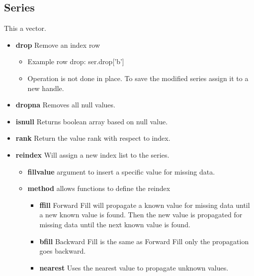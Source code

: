 \subsection{Series}
This a vector.
\begin{itemize}

  \item \textbf{drop} Remove an index row
    \begin{itemize}

      \item Example row drop: ser.drop['b']

      \item Operation is not done in place.  To save the modified series
        assign it to a new handle.
    \end{itemize}

  \item \textbf{dropna} Removes all null values.

  \item \textbf{isnull} Returns boolean array based on null value.

  \item \textbf{rank} Return the value rank with respect to index.

  \item \textbf{reindex} Will assign a new index list to the series.
    \begin{itemize}

      \item \textbf{fill\textunderscore value} argument to insert a specific
        value for missing data.

      \item \textbf{method} allows functions to define the reindex
        \begin{itemize}

          \item \textbf{ffill} Forward Fill will propagate a known value for
            missing data until a new known value is found.  Then the new value
            is propagated for missing data until the next known value is found.

          \item \textbf{bfill} Backward Fill is the same as Forward Fill only
            the propagation goes backward.

          \item \textbf{nearest} Uses the nearest value to propagate unknown
            values.
        \end{itemize}
    \end{itemize}


\end{itemize}
